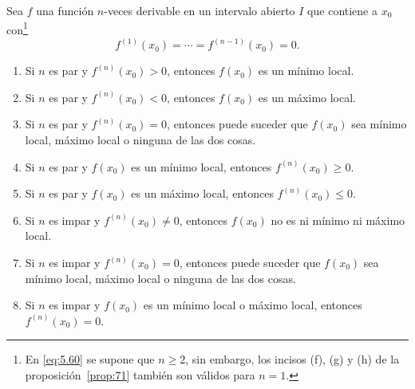 \documentclass[12pt,a4paper]{book}
\begin{document}
    \begin{proposicion}\label{prop:71}
        Sea $f$ una función
        $n$-veces derivable en un intervalo abierto $I$ que contiene a $x_{0}$ con\footnote{En \eqref{eq:5.60} se supone que $n\geq 2$, sin embargo, los incisos (f), (g) y (h) de la proposición~\ref{prop:71}
        también son válidos para $n=1$.}
        \begin{equation}\label{eq:5.60}
            f^{(1)}(x_{0})=\cdots=f^{(n-1)}(x_{0})=0.
        \end{equation}
        \begin{enumerate}[nosep]
            \item Si $n$ es par y $f^{(n)}(x_{0})>0$, entonces $f(x_{0})$ es un mínimo local.
            \item Si $n$ es par y $f^{(n)}(x_{0})<0$, entonces $f(x_{0})$ es un máximo local.
            \item Si $n$ es par y $f^{(n)}(x_{0})=0$, entonces puede suceder que $f(x_{0})$ sea mínimo
            local, máximo local o ninguna de las dos cosas.
            \item Si $n$ es par y $f(x_{0})$ es un mínimo local, entonces $f^{(n)}(x_{0})\geq 0$.
            \item Si $n$ es par y $f(x_{0})$ es un máximo local, entonces $f^{(n)}(x_{0})\leq 0$.
            \item Si $n$ es impar y $f^{(n)}(x_{0})\neq 0$, entonces $f(x_{0})$ no es ni mínimo ni máximo
            local.
            \item Si $n$ es impar y $f^{(n)}(x_{0})=0$, entonces puede suceder que $f(x_{0})$ sea mínimo
            local, máximo local o ninguna de las dos cosas.
            \item Si $n$ es impar y $f(x_{0})$ es un mínimo local o máximo local, entonces
            $f^{(n)}(x_{0})=0$.
        \end{enumerate}
    \end{proposicion}
\end{document}
